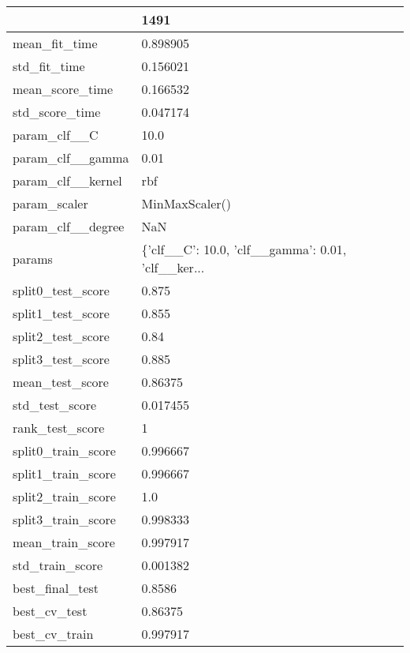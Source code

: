 \begin{tabular}{ll}
\toprule
{} &                                               1491 \\
\midrule
mean\_fit\_time      &                                           0.898905 \\
std\_fit\_time       &                                           0.156021 \\
mean\_score\_time    &                                           0.166532 \\
std\_score\_time     &                                           0.047174 \\
param\_clf\_\_C       &                                               10.0 \\
param\_clf\_\_gamma   &                                               0.01 \\
param\_clf\_\_kernel  &                                                rbf \\
param\_scaler       &                                     MinMaxScaler() \\
param\_clf\_\_degree  &                                                NaN \\
params             &  \{'clf\_\_C': 10.0, 'clf\_\_gamma': 0.01, 'clf\_\_ker... \\
split0\_test\_score  &                                              0.875 \\
split1\_test\_score  &                                              0.855 \\
split2\_test\_score  &                                               0.84 \\
split3\_test\_score  &                                              0.885 \\
mean\_test\_score    &                                            0.86375 \\
std\_test\_score     &                                           0.017455 \\
rank\_test\_score    &                                                  1 \\
split0\_train\_score &                                           0.996667 \\
split1\_train\_score &                                           0.996667 \\
split2\_train\_score &                                                1.0 \\
split3\_train\_score &                                           0.998333 \\
mean\_train\_score   &                                           0.997917 \\
std\_train\_score    &                                           0.001382 \\
best\_final\_test    &                                             0.8586 \\
best\_cv\_test       &                                            0.86375 \\
best\_cv\_train      &                                           0.997917 \\
\bottomrule
\end{tabular}
